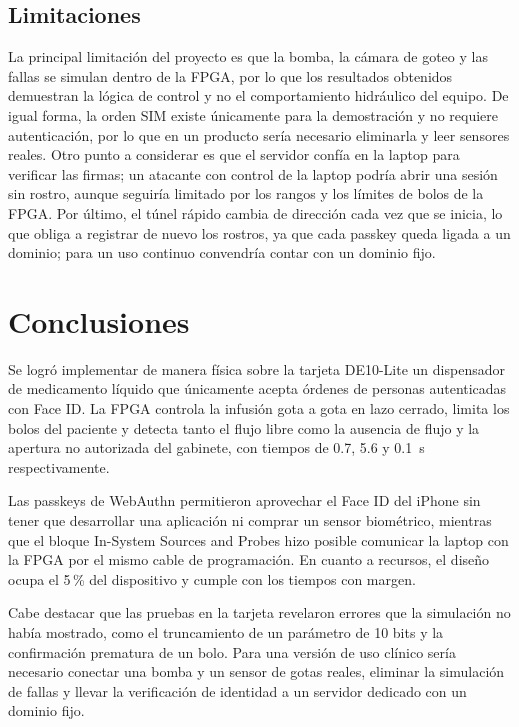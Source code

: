 \documentclass[11pt,letterpaper]{article}
\begin{document}
\subsection{Limitaciones}\label{sec:limitaciones}
La principal limitación del proyecto es que la bomba, la cámara de goteo y las fallas se simulan dentro de la FPGA, por lo que los resultados obtenidos demuestran la lógica de control y no el comportamiento hidráulico del equipo. De igual forma, la orden SIM existe únicamente para la demostración y no requiere autenticación, por lo que en un producto sería necesario eliminarla y leer sensores reales. Otro punto a considerar es que el servidor confía en la laptop para verificar las firmas; un atacante con control de la laptop podría abrir una sesión sin rostro, aunque seguiría limitado por los rangos y los límites de bolos de la FPGA. Por último, el túnel rápido cambia de dirección cada vez que se inicia, lo que obliga a registrar de nuevo los rostros, ya que cada passkey queda ligada a un dominio; para un uso continuo convendría contar con un dominio fijo.

\section{Conclusiones}\label{sec:conclusiones}
Se logró implementar de manera física sobre la tarjeta DE10-Lite un dispensador de medicamento líquido que únicamente acepta órdenes de personas autenticadas con Face ID. La FPGA controla la infusión gota a gota en lazo cerrado, limita los bolos del paciente y detecta tanto el flujo libre como la ausencia de flujo y la apertura no autorizada del gabinete, con tiempos de 0.7, 5.6 y 0.1~s respectivamente.

Las passkeys de WebAuthn permitieron aprovechar el Face ID del iPhone sin tener que desarrollar una aplicación ni comprar un sensor biométrico, mientras que el bloque In-System Sources and Probes hizo posible comunicar la laptop con la FPGA por el mismo cable de programación. En cuanto a recursos, el diseño ocupa el 5\,\% del dispositivo y cumple con los tiempos con margen.

Cabe destacar que las pruebas en la tarjeta revelaron errores que la simulación no había mostrado, como el truncamiento de un parámetro de 10 bits y la confirmación prematura de un bolo. Para una versión de uso clínico sería necesario conectar una bomba y un sensor de gotas reales, eliminar la simulación de fallas y llevar la verificación de identidad a un servidor dedicado con un dominio fijo.
\end{document}
